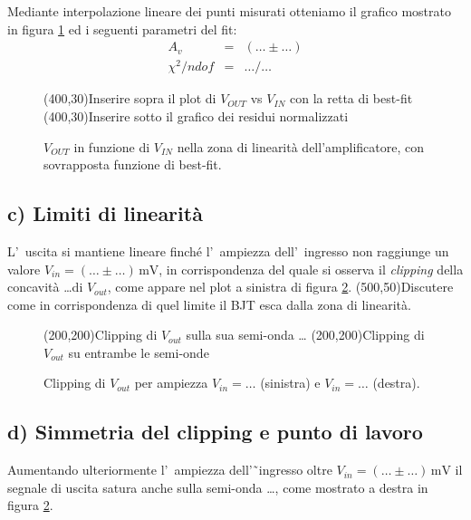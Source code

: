 \documentclass[10pt,a4paper]{article}
\begin{document}
Mediante interpolazione lineare dei punti misurati otteniamo  il grafico
mostrato in figura \ref{fig:fit} ed i seguenti parametri del fit:
\[
\begin{array}{rcl}
A_v &=& (\ldots \pm \ldots) \\
\chi^2/ndof &=&\ldots/\ldots
\end{array}
\]
\begin{figure}[htp]
\begin{center}
\framebox(400,30){Inserire sopra il plot di $V_{OUT}$ vs $V_{IN}$ con la retta di best-fit}
\framebox(400,30){Inserire sotto il grafico dei residui normalizzati}
\caption{$V_{OUT}$ in funzione di $V_{IN}$ nella zona di linearit\`a dell'amplificatore, con sovrapposta funzione di best-fit.}
\label{fig:fit}
\end{center}
\end{figure}


\subsection*{c) Limiti di linearit\`a}
L'~uscita si mantiene lineare finch\'e l'~ampiezza dell'~ingresso non raggiunge un valore $V_{in} = (\ldots \pm \ldots) \,\mathrm{mV}$, in corrispondenza del quale si osserva il {\it clipping} della concavit\`a \dots di $V_{out}$, come appare nel plot a sinistra di figura \ref{fig:clipping}.
\framebox(500,50){Discutere come in corrispondenza di quel limite il BJT esca dalla zona di linearit\`a.}
%
\begin{figure}[htp]
\begin{center}
\framebox(200,200){Clipping di $V_{out}$ sulla sua semi-onda \dots}
\framebox(200,200){Clipping di $V_{out}$ su entrambe le semi-onde}
\end{center}
\caption{Clipping di $V_{out}$ per ampiezza $V_{in} = \ldots$ (sinistra) e $V_{in} = \ldots$ (destra). }
\label{fig:clipping}
\end{figure}
%

\subsection*{d) Simmetria del clipping e punto di lavoro}
Aumentando ulteriormente l'~ampiezza dell'˜ingresso oltre $V_{in} = (\ldots \pm \ldots) \,\mathrm{mV}$ il segnale di uscita satura 
anche sulla semi-onda \dots, come mostrato a destra in figura \ref{fig:clipping}.\\
\end{document}
